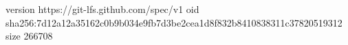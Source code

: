 version https://git-lfs.github.com/spec/v1
oid sha256:7d12a12a35162c0b9b034e9fb7d3be2cea1d8f832b8410838311c37820519312
size 266708
